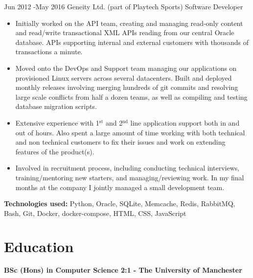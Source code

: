\documentclass[10pt]{article} %
\begin{document}
\jobheader
{Jun 2012 -}{May 2016}
{Geneity Ltd. (part of Playtech Sports)}
{Software Developer}
\vspace{-1cm}
  \begin{itemize}

  \item Initially worked on the API team, creating and managing read-only content
        and read/write transactional XML APIs reading from our central Oracle database.
        APIs supporting internal and external customers with thousands of transactions
        a minute.

  \item Moved onto the DevOps and Support team managing our applications on
        provisioned Linux servers across several datacenters. Built and deployed
        monthly releases involving merging hundreds of git commits and resolving
        large scale conflicts from half a dozen teams, as well as compiling and
        testing database migration scripts.

  \item Extensive experience with 1$^{\textrm{st}}$ and 2$^{\textrm{nd}}$ line application
        support both in and out of hours. Also spent a large amount of time working
        with both technical and non technical customers to fix their issues and
        work on extending features of the product(s).

  \item Involved in recruitment process, including conducting technical interviews,
        training/mentoring new starters, and managing/reviewing work. In my final
        months at the company I jointly managed a small development team.

  \end{itemize}

  \textbf{Technologies used:}
  Python,
  Oracle, SQLite,
  Memcache, Redis,
  RabbitMQ,
  Bash,
  Git,
  Docker, docker-compose,
  HTML, CSS, JavaScript


\section{Education}

\textbf{BSc (Hons) in Computer Science 2:1 - The University of Manchester}
\end{document}
